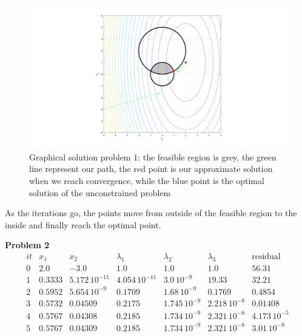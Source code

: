 \documentclass{article}
\begin{document}
\begin{figure}[H]
    \centering
    \includegraphics[width=16cm]{fig1_sqp.png}
    \caption{Graphical solution problem 1: the feasible region is grey, the green line represent our path, the red point is our approximate solution when we reach convergence, while the blue point is the optimal solution of the unconstrained problem }
\end{figure}

As the iterations go, the points move from outside of the feasible region to the inside and finally reach the optimal point. 

\bigskip


\textbf{Problem 2}
\[
\begin{array}{ccccccc} 
it &  x_1 & x_2  & \lambda_1 & \lambda_2 & \lambda_3 & \text{residual}\\
\hline
 0 & 2.0 & -3.0 & 1.0 & 1.0 & 1.0 & 56.31\\ 1 & 0.3333 & 5.172\,{10}^{-11} & 4.054\,{10}^{-11} & 3.0\,{10}^{-9} & 19.33 & 32.21\\ 2 & 0.5952 & 5.654\,{10}^{-9} & 0.1709 & 1.68\,{10}^{-9} & 0.1769 & 0.4854\\ 3 & 0.5732 & 0.04509 & 0.2175 & 1.745\,{10}^{-9} & 2.218\,{10}^{-8} & 0.01408\\ 4 & 0.5767 & 0.04308 & 0.2185 & 1.734\,{10}^{-9} & 2.321\,{10}^{-8} & 4.173\,{10}^{-5}\\ 5 & 0.5767 & 0.04309 & 0.2185 & 1.734\,{10}^{-9} & 2.321\,{10}^{-8} & 3.01\,{10}^{-9} \end{array}
\]
\end{document}
